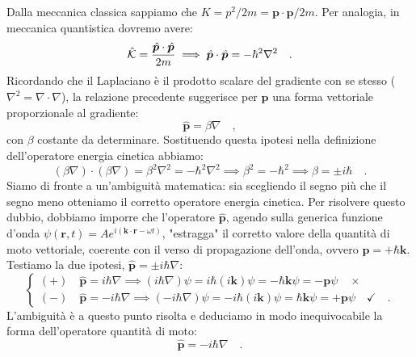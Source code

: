 Dalla meccanica classica sappiamo che $K = p^2/2m = \bm{p}\cdot\bm{p}/{2m}$. Per analogia, in meccanica quantistica dovremo avere:
\begin{equation*}
    \hat{\mathcal{K}} = \frac{\hat{\bm{p}} \cdot \hat{\bm{p}}}{2m} \implies \hat{\bm{p}} \cdot \hat{\bm{p}} = -\hbar^2\nabla^2 \quad.
\end{equation*}
Ricordando che il Laplaciano è il prodotto scalare del gradiente con se stesso ($\nabla^2 = \nabla \cdot \nabla$), la relazione precedente suggerisce per $\hat{\bm{p}}$ una forma vettoriale proporzionale al gradiente:
\begin{equation*}
    \hat{\bm{p}} = \beta \nabla \quad,
\end{equation*}
con $\beta$ costante da determinare. Sostituendo questa ipotesi nella definizione dell'operatore energia cinetica abbiamo:
\begin{equation*}
    (\beta\nabla) \cdot (\beta\nabla) = \beta^2\nabla^2 = -\hbar^2\nabla^2 \implies \beta^2 = -\hbar^2 \implies \beta = \pm i\hbar \quad.
\end{equation*}
Siamo di fronte a un'ambiguità matematica: sia scegliendo il segno più che il segno meno otteniamo il corretto operatore energia cinetica. Per risolvere questo dubbio, dobbiamo imporre che l'operatore $\hat{\bm{p}}$, agendo sulla generica funzione d'onda $\psi(\bm{r},t) = A e^{i(\bm{k}\cdot\bm{r} - \omega t)}$, "estragga" il corretto valore della quantità di moto vettoriale, coerente con il verso di propagazione dell'onda, ovvero $\bm{p} = +\hbar\bm{k}$. Testiamo la due ipotesi, $\hat{\bm{p}} = \pm i\hbar\nabla$:
\[
\begin{cases}
    (+) \quad \hat{\bm{p}} = i\hbar\nabla \implies (i\hbar\nabla) \psi = i\hbar (i\bm{k}) \psi = -\hbar\bm{k}\psi = -\bm{p}\psi \quad  \ensuremath{\times}\\
    (-) \quad \hat{\bm{p}} = -i\hbar\nabla \implies (-i\hbar\nabla) \psi = -i\hbar (i\bm{k}) \psi = \hbar\bm{k}\psi = +\bm{p}\psi \quad \ensuremath{\checkmark} \quad .
\end{cases}
\]
L'ambiguità è a questo punto risolta e deduciamo in modo inequivocabile la forma dell'operatore quantità di moto:
\begin{equation}
    {\hat{\bm{p}} = -i\hbar\nabla} \quad.
    \label{eq:operatore_p}
\end{equation}

